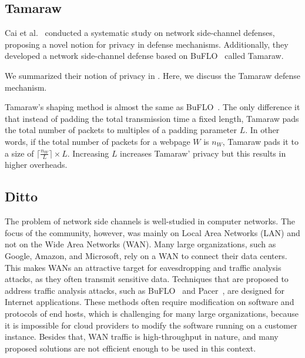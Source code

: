 \subsection{Tamaraw}\label{subsubsec:tamaraw}
Cai et al.~\cite{cai2014systematic} conducted a systematic study on network side-channel defenses, proposing a novel notion for privacy in defense mechanisms.
Additionally, they developed a network side-channel defense based on BuFLO~\cite{dyer2012peek} called Tamaraw. 

We summarized their notion of privacy in . Here, we discuss the Tamaraw defense mechanism.





Tamaraw's shaping method is almost the same as BuFLO~\cite{dyer2012peek}. The only difference it that instead of padding the total transmission time a fixed length, Tamaraw pads the total number of packets to multiples of a padding parameter $L$.
In other words, if the total number of packets for a webpage $W$ is $n_W$, Tamaraw pads it to a size of $\lceil \frac{n_W}{L} \rceil \times L$.
Increasing $L$ increases Tamaraw' privacy but this results in higher overheads.


\subsection{Ditto}\label{subsubsec:ditto}
The problem of network side channels is well-studied in computer networks.
The focus of the community, however, was mainly on Local Area Networks (LAN) and not on the Wide Area Networks (WAN).
Many large organizations, such as Google, Amazon, and Microsoft, rely on a WAN to connect their data centers.
This makes WANs an attractive target for eavesdropping and traffic analysis attacks, as they often transmit sensitive data.
Techniques that are proposed to address traffic analysis attacks, such as BuFLO~\cite{cai2014cs} and Pacer~\cite{mehta2022pacer}, are designed for Internet applications.
These methods often require modification on software and protocols of end hosts, which is challenging for many large organizations, because it is impossible for cloud providers to modify the software running on a customer instance.
Besides that, WAN traffic is high-throughput in nature, and many proposed solutions are not efficient enough to be used in this context.

